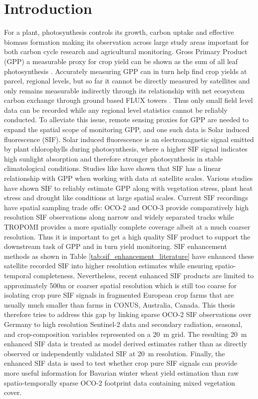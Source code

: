 \chapter{Introduction\label{cha:chapter1}}

For a plant, photosynthesis controls its growth, carbon uptake and effective biomass formation making its observation across large study areas important for both carbon cycle research and agricultural monitoring. Gross Primary Product (GPP) a measurable proxy for crop yield can be shown as the sum of all leaf photosynthesis \cite{friedlingstein2019global}. Accurately measuring GPP can in turn help find crop yields at parcel, regional levels, but so far it cannot be directly measured by satellites and only remains measurable indirectly through its relationship with net ecosystem carbon exchange through ground based FLUX towers \cite{reichstein2005separation}. Thus only small field level data can be recorded while any regional level statistics cannot be reliably conducted. To alleviate this issue, remote sensing proxies for GPP are needed to expand the spatial scope of monitoring GPP, and one such data is Solar induced fluorescence (SIF). Solar induced fluorescence is an electromagnetic signal emitted by plant chlorophylls during photosynthesis, where a higher SIF signal indicates high sunlight absorption and therefore stronger photosynthesis in stable climatological conditions. Studies like \cite{turner2021extreme, magney2020covariation, frankenberg2011new, joiner2011first} have shown that SIF has a linear relationship with GPP when working with data at satellite scales. Various studies \cite{qiu2022monitoring,song2018satellite,peng2020assessing} have shown SIF to reliably estimate GPP along with vegetation stress, plant heat stress and drought like conditions at large spatial scales. Current SIF recordings have spatial sampling trade offs: OCO-2 and OCO-3 provide comparatively high resolution SIF observations along narrow and widely separated tracks while TROPOMI provides a more spatially complete coverage albeit at a much coarser resolution. Thus it is important to get a high quality SIF product to support the downstream task of GPP and in turn yield monitoring. SIF enhancement methods as shown in Table \ref{tab:sif_enhancement_literature} have enhanced these satellite recorded SIF into higher resolution estimates while ensuring spatio-temporal completeness. Nevertheless, recent enhanced SIF products are limited to approximately 500m or coarser spatial resolution which is still too coarse for isolating crop pure SIF signals in fragmented European crop farms that are usually much smaller than farms in CONUS, Australia, Canada. This thesis therefore tries to address this gap by linking sparse OCO-2 SIF observations over Germany to high resolution Sentinel-2 data and secondary radiation, seasonal, and crop-composition variables represented on a 20~m grid. The resulting 20~m enhanced SIF data is treated as model derived estimates rather than as directly observed or independently validated SIF at 20~m resolution. Finally, the enhanced SIF data is used to test whether crop pure SIF signals can provide more useful information for Bavarian winter wheat yield estimation than raw spatio-temporally sparse OCO-2 footprint data containing mixed vegetation cover. 

